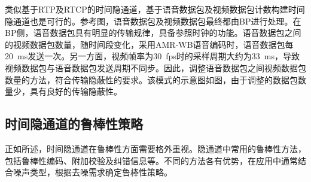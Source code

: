 类似基于RTP及RTCP的时间隐通道，基于语音数据包及视频数据包计数构建时间隐通道也是可行的。参考图，语音数据包及视频数据包最终都由BP进行处理。在BP侧，语音数据包具有明显的传输规律，具备参照时钟的功能。语音数据包之间的视频数据包数量，随时间段变化，采用{AMR-WB}语音编码时，语音数据包每{20\ ms}发送一次。另一方面，视频帧率为{30\ fps}时的采样周期大约为{33\ ms}，导致视频数据包与语音数据包发送周期不同步。因此，调整语音数据包之间视频数据包数量的方法，符合传输隐蔽性的要求。该模式的示意图如图，由于调整的数据包数量少，具有良好的传输隐蔽性。

\subsection{时间隐通道的鲁棒性策略}
\label{chap:backinfo:ctc:robustness}
正如所述，时间隐通道在鲁棒性方面需要格外重视。隐通道中常用的鲁棒性方法，包括鲁棒性编码、附加校验及纠错信息等。不同的方法各有优势，在应用中通常结合噪声类型，根据去噪需求确定鲁棒性策略。



